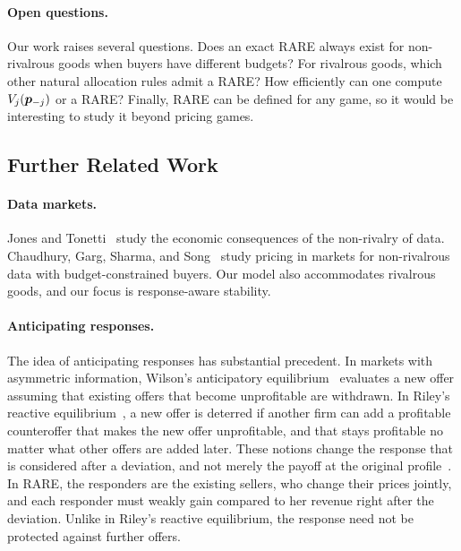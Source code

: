 \paragraph{Open questions.}
Our work raises several questions.
Does an exact RARE always exist for non-rivalrous goods when buyers have different budgets?
For rivalrous goods, which other natural allocation rules admit a RARE?
How efficiently can one compute $V_j(\bm{p}_{-j})$ or a RARE?
Finally, RARE can be defined for any game, so it would be interesting to study it beyond pricing games.

\subsection{Further Related Work}
\label{sec:intro:related}

\paragraph{Data markets.}
Jones and Tonetti~\cite{JonesTonetti2020} study the economic consequences
of the non-rivalry of data.
Chaudhury, Garg, Sharma, and Song~\cite{chaudhury2026equilibrium}
study pricing in markets for non-rivalrous data with budget-constrained buyers.
Our model also accommodates rivalrous goods, and our focus is response-aware stability.

\paragraph{Anticipating responses.}
The idea of anticipating responses has substantial precedent.
In markets with asymmetric information,
Wilson's anticipatory equilibrium~\cite{Wilson1977} evaluates a new offer
assuming that existing offers that become unprofitable are withdrawn.
In Riley's reactive equilibrium~\cite{Riley1979},
a new offer is deterred if another firm can add a profitable counteroffer
that makes the new offer unprofitable,
and that stays profitable no matter what other offers are added later.
These notions change the response that is considered after a deviation,
and not merely the payoff at the original profile~\cite{Riley2001}.
In RARE, the responders are the existing sellers, who change their prices jointly,
and each responder must weakly gain compared to her revenue right after the deviation.
Unlike in Riley's reactive equilibrium, the response need not be protected against further offers.


